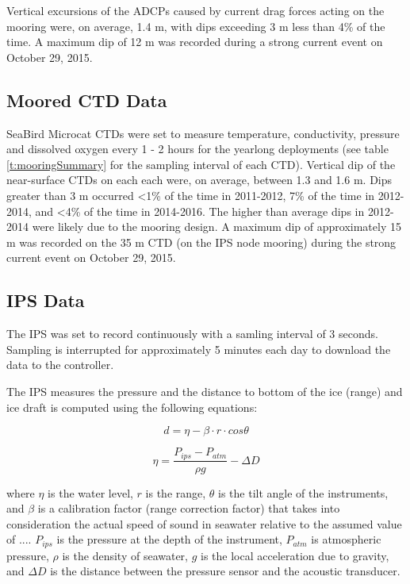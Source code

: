 \documentclass[12pt]{dforeport}
\begin{document}
Vertical excursions of the ADCPs caused by current drag forces acting on the mooring were, on average, 1.4 m, with dips exceeding 3 m less than 4\% of the time. A maximum dip of 12 m was recorded during a strong current event on October 29, 2015.

\subsection{Moored CTD Data}

SeaBird Microcat CTDs were set to measure temperature, conductivity, pressure and dissolved oxygen every 1 - 2 hours for the yearlong deployments (see table \ref{t:mooringSummary} for the sampling interval of each CTD). Vertical dip of the near-surface CTDs on each each were, on average, between 1.3 and 1.6 m. Dips greater than 3 m occurred <1\% of the time in 2011-2012, 7\% of the time in 2012-2014, and <4\% of the time in 2014-2016. The higher than average dips in 2012-2014 were likely due to the mooring design. A maximum dip of approximately 15 m was recorded on the 35 m CTD (on the IPS node mooring) during the strong current event on October 29, 2015.


\subsection{IPS Data}

The IPS was set to record continuously with a samling interval of 3 seconds. Sampling is interrupted for approximately 5 minutes each day to download the data to the controller. 

The IPS measures the pressure and the distance to bottom of the ice (range) and ice draft is computed using
the following equations:

\begin{equation}
d=\eta - \beta \cdot r \cdot cos\theta
\label{e:d}
\end{equation}

\begin{equation}
\eta = \frac{P_{ips} - P_{atm}}{\rho g} - \Delta D
\label{e:eta}
\end{equation}

where $\eta$ is the water level, $\textit{r}$ is the range, $\theta$ is the tilt angle of the instruments, and $\beta$ is a calibration factor (range correction factor) that takes into consideration the actual speed of sound in seawater relative to the assumed value of .... $P_{ips}$ is the pressure at the depth of the instrument, $P_{atm}$ is atmospheric pressure, $\rho$ is the density of seawater, $g$ is the local acceleration due to gravity, and $\Delta D$ is the distance between the pressure sensor and the acoustic transducer.  
\end{document}
